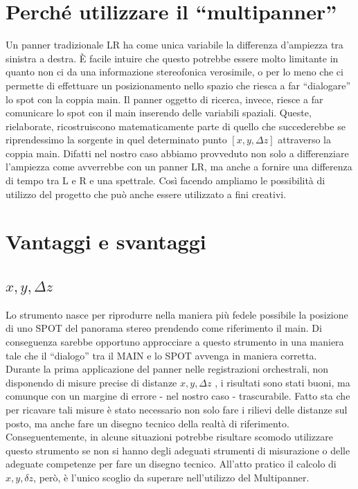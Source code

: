 \documentclass{article}
\begin{document}
\section{Perché utilizzare il ``multipanner''}
    
    Un panner tradizionale LR ha come unica variabile la differenza d'ampiezza tra sinistra a destra. È facile intuire che questo potrebbe essere molto limitante in quanto non ci da una informazione stereofonica verosimile, o per lo meno che ci permette di effettuare un posizionamento nello spazio che riesca a far ``dialogare'' lo spot con la coppia main. Il panner oggetto di ricerca, invece, riesce a far comunicare lo spot con il main inserendo delle variabili spaziali. 
    Queste, rielaborate, ricostruiscono matematicamente parte di quello che succederebbe se riprendessimo la sorgente in quel determinato punto $[x, y, \Delta z]$ attraverso la coppia main. 
    Difatti nel nostro caso abbiamo provveduto non solo a differenziare l'ampiezza come avverrebbe con un panner LR, ma anche a fornire una differenza di tempo tra L e R e una spettrale. Così facendo ampliamo le possibilità di utilizzo del progetto che può anche essere utilizzato a fini creativi.

\section{Vantaggi e svantaggi}

\subsection{$x, y, \Delta z$}
    Lo strumento nasce per riprodurre nella maniera più fedele possibile la posizione di uno SPOT del panorama stereo prendendo come riferimento il main. Di conseguenza sarebbe opportuno approcciare a questo strumento in una maniera tale che il ``dialogo'' tra il MAIN e lo SPOT avvenga in maniera corretta.
    Durante la prima applicazione del panner nelle registrazioni orchestrali, non disponendo di misure precise di distanze $x, y, \Delta z$ , i risultati sono stati buoni, ma comunque con un margine di errore - nel nostro caso - trascurabile.
    Fatto sta che per ricavare tali misure è stato necessario non solo fare i rilievi delle distanze sul posto, ma anche fare un disegno tecnico della realtà di riferimento. Conseguentemente, in alcune situazioni potrebbe risultare scomodo utilizzare questo strumento se non si hanno degli adeguati strumenti di misurazione o delle adeguate competenze per fare un disegno tecnico. All'atto pratico il calcolo di  $x, y, \delta z$, però, è l'unico scoglio da superare nell'utilizzo del Multipanner.
\end{document}
